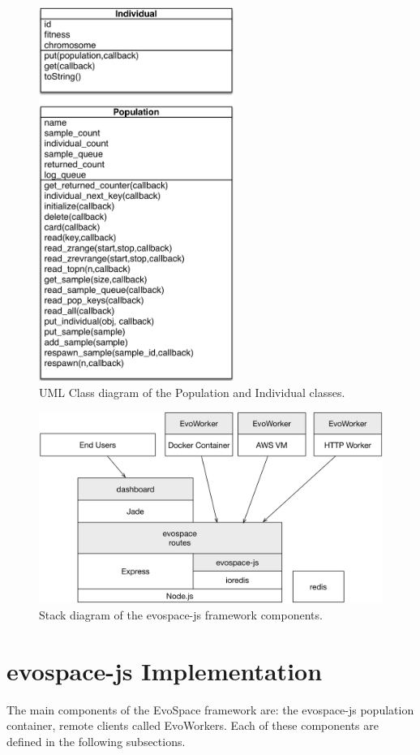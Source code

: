 \begin{figure}[!t]
    \centering
        \includegraphics[width=2.5in]{img/classes.png}
    \caption{ UML Class diagram of the Population and Individual classes.}
    \label{fig:classes}
\end{figure}
%
\begin{figure}[!t]
    \centering
        \includegraphics[width=5.4in]{img/evospace-js.png}
    \caption{ Stack diagram of the evospace-js framework components.}
    \label{fig:stack}
\end{figure}

\section{evospace-js Implementation}
\label{sec:evo}
The main components of the EvoSpace framework are: the evospace-js 
population container, remote clients called EvoWorkers.
Each of these components are defined in the following subsections.

